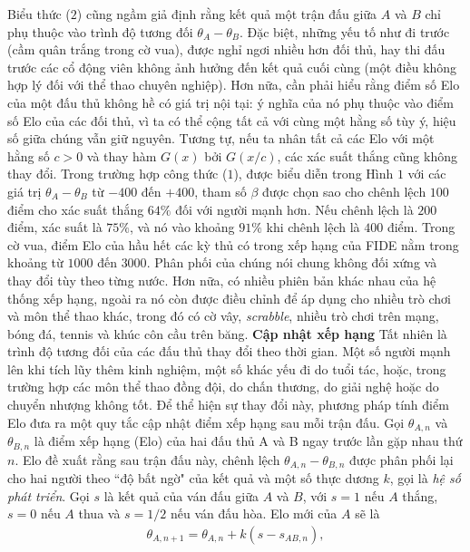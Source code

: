 \begin{multicols}{2}
	\vskip 0.05cm
	Biểu thức ($2$) cũng ngầm giả định rằng kết quả một trận đấu giữa $A$ và $B$ chỉ phụ thuộc vào trình độ tương đối $\theta_A - \theta_B$. Đặc biệt, những yếu tố như đi trước (cầm quân trắng trong cờ vua), được nghỉ ngơi nhiều hơn đối thủ, hay thi đấu trước các cổ động viên không ảnh hưởng đến kết quả cuối cùng (một điều không hợp lý đối với thể thao chuyên nghiệp).
	\vskip 0.05cm
	Hơn nữa, cần phải hiểu rằng điểm số Elo của một đấu thủ không hề có giá trị nội tại: ý nghĩa của nó phụ thuộc vào điểm số Elo của các đối thủ, vì ta có thể cộng tất cả với cùng một hằng số tùy ý, hiệu số giữa chúng vẫn giữ nguyên. Tương tự, nếu ta nhân tất cả các Elo với một hằng số $c > 0$ và thay hàm $G(x)$ bởi $G(x / c)$, các xác suất thắng cũng không thay đổi.
	\vskip 0.05cm
	Trong trường hợp công thức ($1$), được biểu diễn trong Hình $1$ với các giá trị $\theta_A - \theta_B$ từ $-400$ đến $+400$, tham số $\beta$ được chọn sao cho chênh lệch $100$ điểm cho xác suất thắng $64\%$ đối với người mạnh hơn. Nếu chênh lệch là $200$ điểm, xác suất là $75\%$, và nó vào khoảng $91\%$ khi chênh lệch là $400$ điểm.
	\vskip 0.05cm
	Trong cờ vua, điểm Elo của hầu hết các kỳ thủ có trong xếp hạng của FIDE nằm trong khoảng từ $1000$ đến $3000$. Phân phối của chúng nói chung không đối xứng và thay đổi tùy theo từng nước. Hơn nữa, có nhiều phiên bản khác nhau của hệ thống xếp hạng, ngoài ra nó còn được điều chỉnh để áp dụng cho nhiều trò chơi và môn thể thao khác, trong đó có cờ vây, \textit{scrabble}, nhiều trò chơi trên mạng, bóng đá, tennis và khúc côn cầu trên băng.
	\vskip 0.05cm
	\textbf{\color{toanhocdoisong}Cập nhật xếp hạng}
	\vskip 0.05cm
	Tất nhiên là trình độ tương đối của các đấu thủ thay đổi theo thời gian. Một số người mạnh lên khi tích lũy thêm kinh nghiệm, một số khác yếu đi do tuổi tác, hoặc, trong trường hợp các môn thể thao đồng đội, do chấn thương, do giải nghệ hoặc do chuyển nhượng không tốt.
	\vskip 0.05cm
	Để thể hiện sự thay đổi này, phương pháp tính điểm Elo đưa ra một quy tắc cập nhật điểm xếp hạng sau mỗi trận đấu. Gọi $\theta_{A, n}$ và $\theta_{B, n}$ là điểm xếp hạng (Elo) của hai đấu thủ A và B ngay trước lần gặp nhau thứ $n$. Elo đề xuất rằng sau trận đấu này, chênh lệch $\theta_{A, n} - \theta_{B, n}$ được phân phối lại cho hai người theo ``độ bất ngờ" của kết quả và một số thực dương $k$, gọi là \textit{hệ số phát triển}.
	\vskip 0.05cm
	Gọi $s$ là kết quả của ván đấu giữa $A$ và $B$, với $s = 1$ nếu $A$ thắng, $s = 0$ nếu $A$ thua và $s = 1/2$ nếu ván đấu hòa. Elo mới của $A$ sẽ là
	\begin{align*}
		\theta_{A, n + 1} = \theta_{A, n} + k (s - s_{AB, n}),

\end{align*}
\end{multicols}
